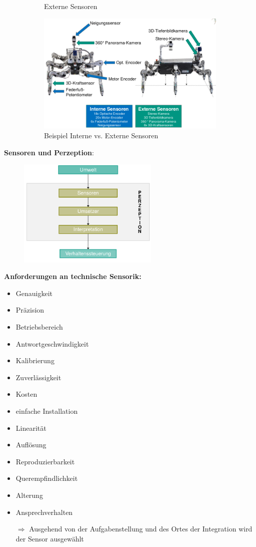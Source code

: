 \begin{figure}[h!]
\begin{subfigure}{.5\textwidth}
		\caption{Externe Sensoren}
	\end{subfigure}
	\begin{subfigure}{.5\textwidth}
		\includegraphics[width=\linewidth]{figures/ch04_intext.png}
		\caption{Beispiel Interne vs. Externe Sensoren}
	\end{subfigure}
	\caption{}
\end{figure}
\textbf{Sensoren und Perzeption}:
\begin{figure}[h!]
	\centering
	\includegraphics[width=0.6\textwidth]{figures/ch04_sensperz.png}
	\caption{}
	\label{sensperz}
\end{figure}
\textbf{Anforderungen an technische Sensorik:}
\begin{itemize}
\setlength\itemsep{0em}
\item Genauigkeit 
\item Präzision 
\item Betriebsbereich 
\item Antwortgeschwindigkeit 
\item Kalibrierung 
\item Zuverlässigkeit 
\item Kosten
\item einfache Installation
\item Linearität
\item Auflösung
\item Reproduzierbarkeit
\item Querempfindlichkeit
\item Alterung
\item Ansprechverhalten
\item[$\Rightarrow$] Ausgehend von der Aufgabenstellung und des Ortes der Integration wird der Sensor ausgewählt
\end{itemize}

